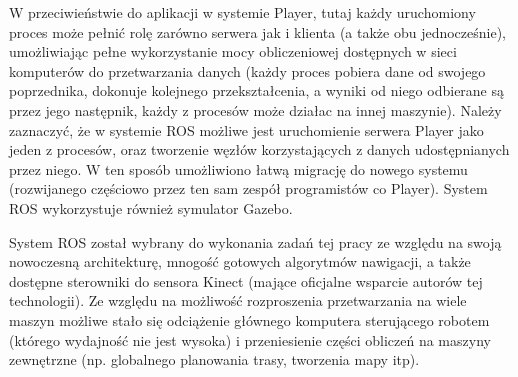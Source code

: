 W przeciwieństwie do aplikacji w systemie Player, tutaj każdy uruchomiony proces
może pełnić rolę zarówno serwera jak i klienta (a także obu jednocześnie), umożliwiając
pełne wykorzystanie mocy obliczeniowej dostępnych w sieci komputerów do przetwarzania
danych (każdy proces pobiera dane od swojego poprzednika, dokonuje kolejnego przekształcenia,
a wyniki od niego odbierane są przez jego następnik, każdy z procesów może działac na
innej maszynie). Należy zaznaczyć, że w systemie ROS możliwe jest uruchomienie serwera Player jako
jeden z procesów, oraz tworzenie węzłów korzystających z danych udostępnianych przez
niego. W ten sposób umożliwiono łatwą migrację do nowego systemu (rozwijanego częściowo
przez ten sam zespół programistów co Player). System ROS wykorzystuje również symulator
Gazebo.

System ROS został wybrany do wykonania zadań tej pracy ze względu na swoją nowoczesną
architekturę, mnogość gotowych algorytmów nawigacji, a także dostępne sterowniki
do sensora Kinect (mające oficjalne wsparcie autorów tej technologii). Ze względu
na możliwość rozproszenia przetwarzania na wiele maszyn możliwe stało się odciążenie
głównego komputera sterującego robotem (którego wydajność nie jest wysoka) i przeniesienie
części obliczeń na maszyny zewnętrzne (np. globalnego planowania trasy, tworzenia
mapy itp).
